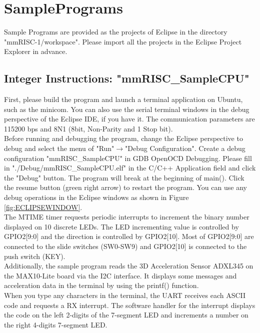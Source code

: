 \section{SamplePrograms}
Sample Programs are provided as the projects of Eclipse in the directory "mmRISC-1/workspace". Please import all the projects in the Eclipse Project Explorer in advance.

\subsection{Integer Instructions: "mmRISC\_SampleCPU"}
First, please build the program and launch a terminal application on Ubuntu, such as the minicom. You can also use the serial terminal windows in the debug perspective of the Eclipse IDE, if you have it. The communication parameters are 115200 bps and 8N1 (8bit, Non-Parity and 1 Stop bit).\\

Before running and debugging the program, change the Eclipse perspective to debug and select the menu of "Run"$\rightarrow$"Debug Configuration". Create a debug configuration "mmRISC\_SampleCPU" in GDB OpenOCD Debugging. Please fill in "./Debug/mmRISC\_SampleCPU.elf" in the C/C++ Application field and click the "Debug" button. The program will break at the beginning of main(). Click the resume button (green right arrow) to restart the program. You can use any debug operations in the Eclipse windows as shown in Figure \ref{fig:ECLIPSEWINDOW}.\\

The MTIME timer requests periodic interrupts to increment the binary number displayed on 10 discrete LEDs. The LED incrementing value is controlled by GPIO2[9:0] and the direction is controlled by GPIO2[10]. Most of GPIO2[9:0] are connected to the slide switches (SW0-SW9) and GPIO2[10] is connected to the push switch (KEY).\\

Additionally, the sample program reads the 3D Acceleration Sensor ADXL345 on the MAX10-Lite board via the I2C interface. It displays some messages and acceleration data in the terminal by using the printf() function.\\

When you type any characters in the terminal, the UART receives each ASCII code and requests a RX interrupt. The software handler for the interrupt displays the code on the left 2-digits of the 7-segment LED and increments a number on the right 4-digits 7-segment LED.\\

